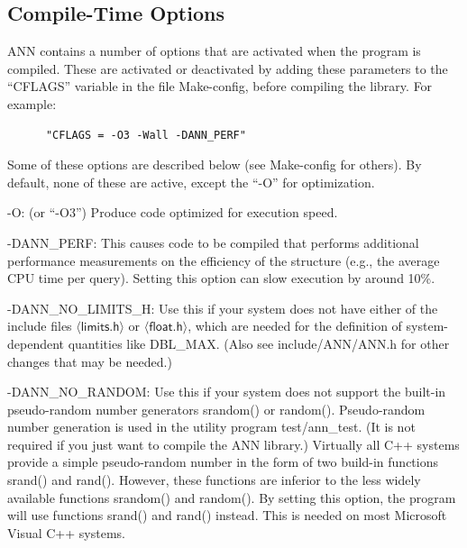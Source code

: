 \documentclass[11pt]{article}		%
\newcommand\ang[1]{\langle #1\rangle}
\newenvironment{description*}%
  {\begin{description}%
    \setlength{\itemsep}{-0.5ex}%
    \setlength{\parsep}{0pt}}%
  {\end{description}}
\newcommand{\ANN}[0]{\textsf{ANN}}
\begin{document}
\subsection{Compile-Time Options}\label{compileopt.sec}

{\ANN} contains a number of options that are activated when the program
is compiled.  These are activated or deactivated by adding these
parameters to the ``\textsf{CFLAGS}'' variable in the file
\textsf{Make-config}, before compiling the library.  For example:
\begin{verbatim}
      "CFLAGS = -O3 -Wall -DANN_PERF"
\end{verbatim}
Some of these options are described below (see \textsf{Make-config} for
others). By default, none of these are active, except the ``-O'' for
optimization.

\begin{description*}
\item[\hbox{\sf -O:}] (or ``\textsf{-O3}'') Produce code optimized for
	execution speed.
\item[\hbox{\sf -DANN\_PERF:}] This causes code to be compiled that
	performs additional performance measurements on the efficiency of
	the structure (e.g., the average CPU time per query). Setting this
	option can slow execution by around 10\%.
\item[\hbox{\sf -DANN\_NO\_LIMITS\_H:}] Use this if your system does
	not have either of the include files $\ang{\textsf{limits.h}}$ or
	$\ang{\textsf{float.h}}$, which are needed for the definition of
	system-dependent quantities like \textsf{DBL\_MAX}. (Also see
	\textsf{include/ANN/ANN.h} for other changes that may be needed.)
\item[\hbox{\sf -DANN\_NO\_RANDOM:}] Use this if your system does
	not support the built-in pseudo-random number generators
	\textsf{srandom()} or \textsf{random()}.  Pseudo-random number
	generation is used in the utility program \textsf{test/ann\_test}.
	(It is not required if you just want to compile the {\ANN} library.)
	Virtually all C++ systems provide a simple pseudo-random number in
	the form of two build-in functions \textsf{srand()} and
	\textsf{rand()}.  However, these functions are inferior to the less
	widely available functions \textsf{srandom()} and \textsf{random()}.
	By setting this option, the program will use functions
	\textsf{srand()} and \textsf{rand()} instead.  This is needed on
	most Microsoft Visual C++ systems.
\end{description*}
\end{document}
